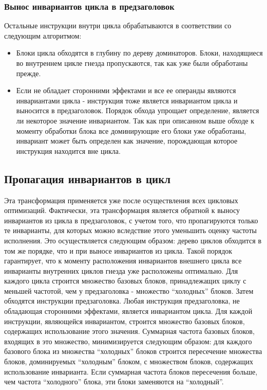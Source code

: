 \subsubsection{Вынос инвариантов цикла в предзаголовок}

Остальные инструкции внутри цикла обрабатываются в соответствии со следующим алгоритмом:
\begin{itemize}
    \item Блоки цикла обходятся в глубину по дереву доминаторов.
        Блоки, находящиеся во внутреннем цикле гнезда пропускаются, так как уже были обработаны прежде.
    \item Если не обладает сторонними эффектами и все ее операнды являются инвариантами цикла - инструкция тоже является инвариантом цикла и выносится в предзаголовок.
        Порядок обхода упрощает определение, является ли некоторое значение инвариантом.
        Так как при описанном выше обходе к моменту обработки блока все доминирующие его блоки уже обработаны, инвариант может быть определен как значение, порождающая которое инструкция находится вне цикла.
\end{itemize}

\subsection{Пропагация инвариантов в цикл}

Эта трансформация применяется уже после осуществления всех цикловых оптимизаций.
Фактически, эта трансформация является обратной к выносу инвариантов из цикла в предзаголовок, с учетом того, что пропагируются только те инварианты, для которых можно вследствие этого уменьшить оценку частоты исполнения.
Это осуществляется следующим образом:
дерево циклов обходится в том же порядке, что и при выносе инвариантов из цикла.
Такой порядок гарантирует, что к моменту расположения инвариантов внешнего цикла все инварианты внутренних циклов гнезда уже расположены оптимально.
Для каждого цикла строится множество базовых блоков, принадлежащих циклу с меньшей частотой, чем у предзаголовка - множество \enquote{холодных} блоков.
Затем обходятся инструкции предзаголовка.
Любая инструкция предзаголовка, не обладающая сторонними эффектами, является инвариантом цикла.
Для каждой инструкции, являющейся инвариантом, строится множество базовых блоков, содержащих использование этого значения.
Суммарная частота базовых блоков, входящих в это множество, минимизируется следующим образом:
для каждого базового блока из множества \enquote{холодных} блоков строится пересечение множества блоков, доминируемых \enquote{холодным} блоком, с множеством блоков, содержащих использование инварианта.
Если суммарная частота блоков пересечения больше, чем частота \enquote{холодного} блока, эти блоки заменяются на \enquote{холодный}.

